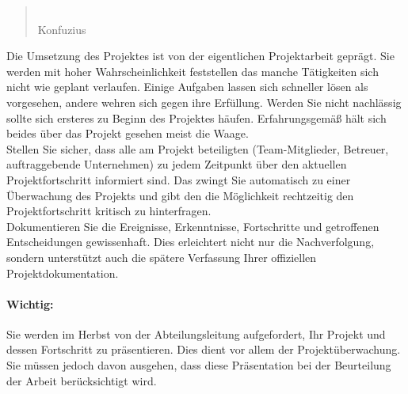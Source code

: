 \renewcommand*{\authorOfNextLines}{Helmut Quinz}
\begin{quote}
	\\
	\small{Konfuzius}
\end{quote}
Die Umsetzung des Projektes ist von der eigentlichen Projektarbeit geprägt. 
Sie werden mit hoher Wahrscheinlichkeit feststellen das manche Tätigkeiten sich nicht wie geplant verlaufen.
Einige Aufgaben lassen sich schneller lösen als vorgesehen, andere wehren sich gegen ihre Erfüllung.
Werden Sie nicht nachlässig sollte sich ersteres zu Beginn des Projektes häufen. 
Erfahrungsgemäß hält sich beides über das Projekt gesehen meist die Waage.\\
Stellen Sie sicher, dass alle am Projekt beteiligten (Team-Mitglieder, Betreuer, auftraggebende Unternehmen) zu jedem Zeitpunkt über den aktuellen Projektfortschritt informiert sind.
Das zwingt Sie automatisch zu einer Überwachung des Projekts und gibt den  die Möglichkeit rechtzeitig den Projektfortschritt kritisch zu hinterfragen.\\

Dokumentieren Sie die Ereignisse, Erkenntnisse, Fortschritte und getroffenen Entscheidungen gewissenhaft. 
Dies erleichtert nicht nur die Nachverfolgung, sondern unterstützt auch die spätere Verfassung Ihrer offiziellen Projektdokumentation.

\paragraph{Wichtig:} Sie werden im Herbst von der Abteilungsleitung aufgefordert, Ihr Projekt und dessen Fortschritt zu präsentieren. 
Dies dient vor allem der Projektüberwachung.
Sie müssen jedoch davon ausgehen, dass diese Präsentation bei der Beurteilung der Arbeit berücksichtigt wird.